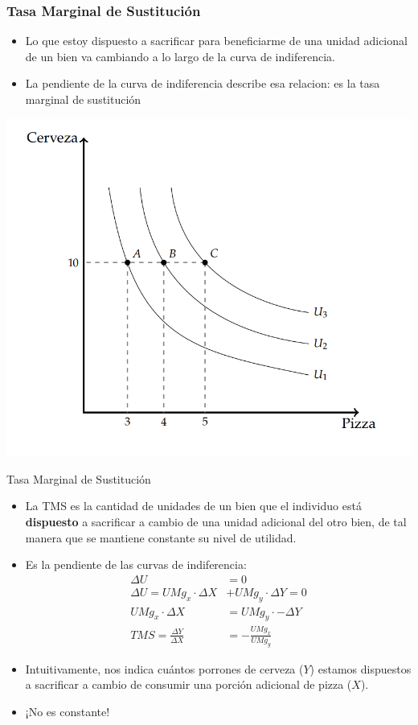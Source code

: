 \documentclass{beamer}
\begin{document}
\begin{frame}
\frametitle{Tasa Marginal de Sustitución}
\begin{itemize}
    \item Lo que estoy dispuesto a sacrificar para beneficiarme de una unidad adicional de un bien va cambiando a lo largo de la curva de indiferencia.
    \item La pendiente de la curva de indiferencia describe esa relacion: es la tasa marginal de sustitución
\end{itemize} 
\centering
\includegraphics[scale=0.5]{../Figures/C7.9.png}
\end{frame}

\begin{frame}{Tasa Marginal de Sustitución}
    \begin{itemize}
        \item La TMS es la cantidad de unidades de un bien que el individuo está \textbf{dispuesto} a sacrificar a cambio de una unidad adicional del otro bien, de tal manera que se mantiene constante su nivel de utilidad.
        \item Es la pendiente de las curvas de indiferencia:
        \begin{align*}
            \Delta U &= 0 \\
            \Delta U = UMg_x \cdot \Delta X &+ UMg_y \cdot \Delta Y = 0 \\
            UMg_x \cdot \Delta X &= UMg_y \cdot - \Delta Y \\
            TMS = \frac{\Delta Y}{\Delta X} &= - \frac{UMg_x}{UMg_y}
        \end{align*}    
        \item Intuitivamente, nos indica cuántos porrones de cerveza ($Y$) estamos dispuestos a sacrificar a cambio de consumir una porción adicional de pizza ($X$).
        \item ¡No es constante!
    \end{itemize} 
\end{frame}
\end{document}
